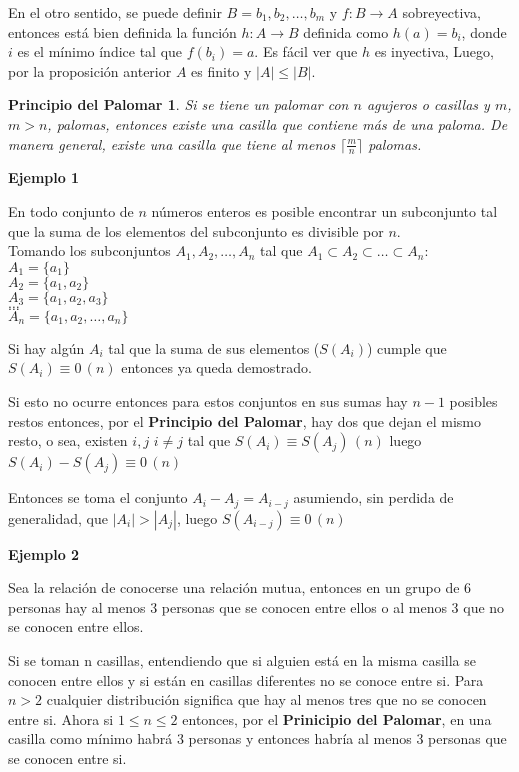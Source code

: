 \documentclass[a4paper,12pt]{report}
\newtheorem*{ppa}{Principio del Palomar}
\begin{document}
En el otro sentido, se puede definir $B={b_1,b_2,\dots,b_m}$ y $f:B\rightarrow A$ sobreyectiva, entonces está bien definida la función $h:A\rightarrow B$ definida como $h(a)=b_i$, donde $i$ es el mínimo índice tal que $f(b_i)=a$. Es fácil ver que $h$ es inyectiva, Luego, por la proposición anterior  $A$ es finito y $|A|\leq|B|$.

\begin{ppa}
 Si se tiene un palomar con $n$ agujeros o casillas y $m$, $m>n$, palomas, entonces existe una casilla que contiene más de una paloma. De manera general, existe una casilla que tiene al menos $\lceil {\frac{m}{n}} \rceil$ palomas.
\end{ppa}

\textbf{Ejemplo 1}

 En todo conjunto de $n$ números enteros es posible encontrar un subconjunto tal que la suma de los elementos del subconjunto es divisible por $n$.\\

 Tomando los subconjuntos $A_1,A_2,\dots,A_n$ tal que $A_1\subset A_2 \subset\dots\subset A_n$:\\
 $A_1=\{a_1\}$\\
 $A_2=\{a_1,a_2\}$\\  
 $A_3=\{a_1,a_2,a_3\}$\\
 $\dots$\\
 $\dots$\\
 $A_n=\{a_1,a_2,\dots,a_n\}$
 
 Si hay algún $A_i$ tal que la suma de sus elementos ($S(A_i)$) cumple que $S(A_i)\equiv 0 \, (n)$ entonces ya queda demostrado.
 
 Si esto no ocurre entonces para estos conjuntos en sus sumas hay $n-1$ posibles restos entonces, por el \textbf{Principio del Palomar}, hay dos que dejan el mismo resto, o sea,
 existen $i,j$ $i\neq j$ tal que $S(A_i)\equiv S(A_j) \, (n)$ luego $S(A_i) - S(A_j)\equiv 0 \, (n)$
 
 Entonces se toma el conjunto $A_i - A_j = A_{i-j}$ asumiendo, sin perdida de generalidad, que $|A_i|>|A_j|$, luego $S(A_{i-j})\equiv 0 \, (n)$
 
 
 \textbf{Ejemplo 2}

 Sea la relación de conocerse una relación mutua, entonces en un grupo de 6 personas hay al menos 3 personas que se conocen entre ellos o al menos 3 que no se conocen entre ellos.
 
 Si se toman n casillas, entendiendo que si alguien está en la misma casilla se conocen entre ellos y si están en casillas diferentes no se conoce entre si. Para $n > 2$ cualquier distribución significa que hay al menos tres que no se conocen entre si. Ahora si $1\leq n \leq 2$
 entonces, por el \textbf{Prinicipio del Palomar}, en una casilla como mínimo habrá 3 personas y entonces habría al menos 3 personas que se conocen entre si.
 
 
\end{document}
